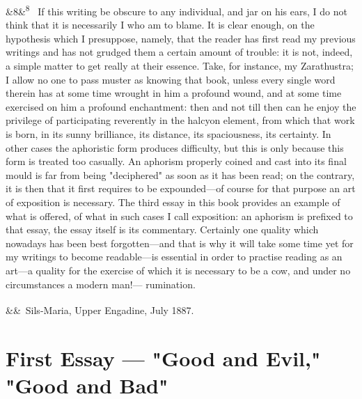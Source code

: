 \documentclass[12pt]{article}
\newcommand{\para}[1][]{\par\noindent\ifx&#1&\else\textsuperscript{\footnotesize #1}~\fi}
\begin{document}
\para[8] If this writing be obscure to any individual, and jar on his ears, I do not think that it is necessarily I who am to blame. It is clear enough, on the hypothesis which I presuppose, namely, that the reader has first read my previous writings and has not grudged them a certain amount of trouble: it is not, indeed, a simple matter to get really at their essence. Take, for instance, my Zarathustra; I allow no one to pass muster as knowing that book, unless every single word therein has at some time wrought in him a profound wound, and at some time exercised on him a profound enchantment: then and not till then can he enjoy the privilege of participating reverently in the halcyon element, from which that work is born, in its sunny brilliance, its distance, its spaciousness, its certainty. In other cases the aphoristic form produces difficulty, but this is only because this form is treated too casually. An aphorism properly coined and cast into its final mould is far from being "deciphered" as soon as it has been read; on the contrary, it is then that it first requires to be expounded---of course for that purpose an art of exposition is necessary. The third essay in this book provides an example of what is offered, of what in such cases I call exposition: an aphorism is prefixed to that essay, the essay itself is its commentary. Certainly one quality which nowadays has been best forgotten---and that is why it will take some time yet for my writings to become readable---is essential in order to practise reading as an art---a quality for the exercise of which it is necessary to be a cow, and under no circumstances a modern man!--- rumination.

\para Sils-Maria, Upper Engadine, July 1887.

\section*{First Essay --- "Good and Evil," "Good and Bad"}
\end{document}
